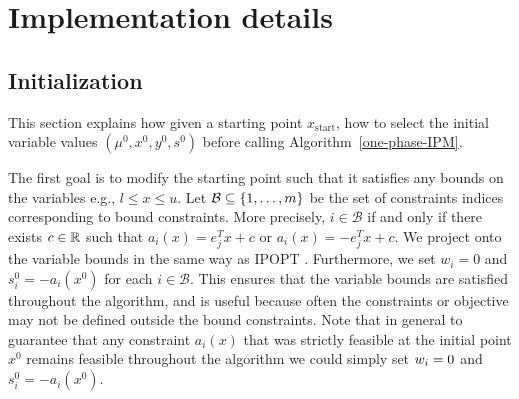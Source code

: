 \documentclass{article}
\begin{document}

\section{Implementation details}\label{sec:implementation-details}


\subsection{Initialization}\label{sec:initialization}


This section explains how given a starting point $x_{\text{start}}$, how to select the initial variable values $(\mu^0,x^0, y^0, s^0)$ before calling Algorithm~\ref{one-phase-IPM}.

The first goal is to modify the starting point such that it satisfies any bounds on the variables e.g., $l \le x \le u$. Let $\mathcal{B} \subseteq \{ 1, \dots, m \}$ be the set of constraints indices corresponding to bound constraints. More precisely, $i \in \mathcal{B}$ if and only if there exists $c \in \mathbb{R}$ such that $a_i(x) = e_j^T x + c$ or $a_i(x) = -e_j^T x + c$. We project onto the variable bounds in the same way as IPOPT \cite[Section 3.7]{wachter2006implementation}. Furthermore, we set $w_i = 0$ and $s_i^{0} = -a_i(x^0)$ for each $i \in \mathcal{B}$. This ensures that the variable bounds are satisfied throughout the algorithm, and is useful because often the constraints or objective may not be defined outside the bound constraints. Note that in general to guarantee that any constraint $a_i(x)$ that was strictly feasible at the initial point $x^{0}$ remains feasible throughout the algorithm we could simply set $w_i = 0$ and $s_i^{0} = -a_i(x^0)$.
 



\end{document}
